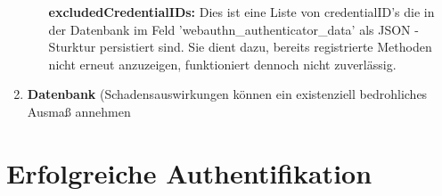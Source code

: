 \begin{enumerate}
\begin{itemize}
\textbf{excludedCredentialIDs:} Dies ist eine Liste von credentialID's die in der Datenbank im Feld 'webauthn\_authenticator\_data' als JSON - Sturktur persistiert sind. Sie dient dazu, bereits registrierte Methoden nicht erneut anzuzeigen, funktioniert dennoch nicht zuverlässig.
\end{itemize}

\item \textbf{Datenbank} (Schadensauswirkungen können ein existenziell bedrohliches Ausmaß annehmen
\end{enumerate}

\section{Erfolgreiche Authentifikation}



